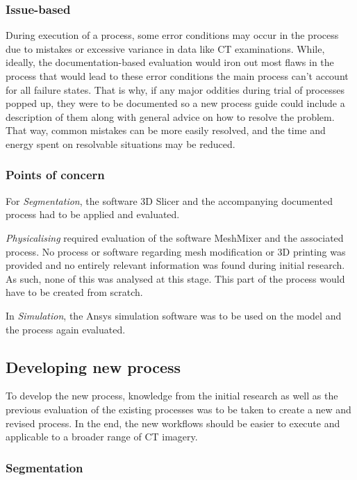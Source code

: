 \documentclass[MME,Projekt,english]{twbook}%
\begin{document}
\subsubsection{Issue-based}

During execution of a process, some error conditions may occur in the process due to mistakes or excessive variance in data like CT examinations. While, ideally, the documentation-based evaluation would iron out most flaws in the process that would lead to these error conditions the main process can’t account for all failure states. That is why, if any major oddities during trial of processes popped up, they were to be documented so a new process guide could include a description of them along with general advice on how to resolve the problem. That way, common mistakes can be more easily resolved, and the time and energy spent on resolvable situations may be reduced. 

\subsubsection{Points of concern}

For \emph{Segmentation}, the software 3D Slicer and the accompanying documented process had to be applied and evaluated.

\emph{Physicalising} required evaluation of the software MeshMixer and the associated process. No process or software regarding mesh modification or 3D printing was provided and no entirely relevant information was found during initial research. As such, none of this was analysed at this stage. This part of the process would have to be created from scratch.

In \emph{Simulation}, the Ansys simulation software was to be used on the model and the process again evaluated.

\subsection{Developing new process}

To develop the new process, knowledge from the initial research as well as the previous evaluation of the existing processes was to be taken to create a new and revised process. In the end, the new workflows should be easier to execute and applicable to a broader range of CT imagery.

\subsubsection{Segmentation}
\end{document}
